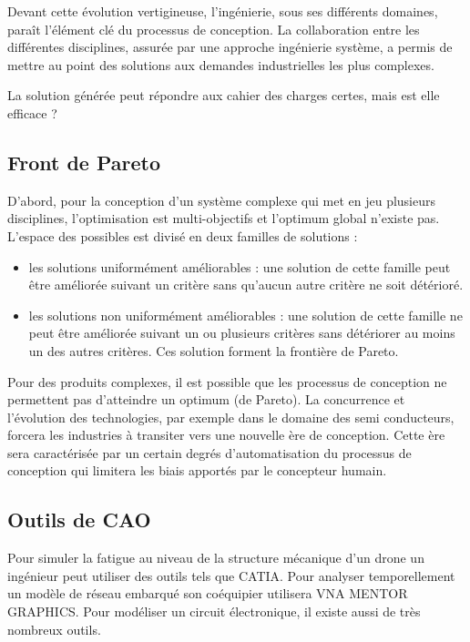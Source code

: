 \documentclass[11pt]{article}
\begin{document}
Devant cette évolution vertigineuse, l'ingénierie, sous ses différents domaines,
paraît l'élément clé du processus de conception. La collaboration entre les
différentes disciplines, assurée par une approche ingénierie système, a permis
de mettre au point des solutions aux demandes industrielles les plus complexes.

La solution générée peut répondre aux cahier des charges certes, mais est elle
efficace ?

\subsection{Front de Pareto}

D'abord, pour la conception d'un système complexe qui met en jeu plusieurs
disciplines, l'optimisation est multi-objectifs et l'optimum global n'existe
pas. L'espace des possibles est divisé en deux familles de solutions :
\begin{itemize}
\item les solutions uniformément améliorables : une solution de cette famille
peut être améliorée suivant un critère sans qu'aucun autre critère ne soit
détérioré.
\item les solutions non uniformément améliorables : une solution de cette
famille ne peut être améliorée suivant un ou plusieurs critères sans détériorer
au moins un des autres critères. Ces solution forment la frontière de Pareto.
\end{itemize}

Pour des produits complexes, il est possible que les processus de conception ne
permettent pas d'atteindre un optimum (de Pareto). La concurrence et l'évolution
des technologies, par exemple dans le domaine des semi conducteurs, forcera les
industries à transiter vers une nouvelle ère de conception. Cette ère sera
caractérisée par un certain degrés d'automatisation du processus de conception
qui limitera les biais apportés par le concepteur humain.

\subsection{Outils de CAO}

Pour simuler la fatigue au niveau de la structure mécanique d'un drone un
ingénieur peut utiliser des outils tels que CATIA. Pour analyser
temporellement un modèle de réseau embarqué son coéquipier utilisera VNA MENTOR
GRAPHICS. Pour modéliser un circuit électronique, il existe aussi de très
nombreux outils.
\end{document}
